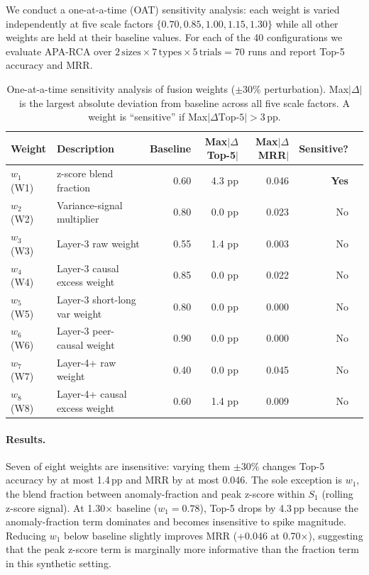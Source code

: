\documentclass{article}
\newcommand{\aparca}{\textsc{APA-RCA}}
\begin{document}
We conduct a one-at-a-time (OAT) sensitivity analysis: each weight is varied
independently at five scale factors $\{0.70, 0.85, 1.00, 1.15, 1.30\}$
while all other weights are held at their baseline values.
For each of the 40 configurations we evaluate \aparca{} over
$2\,\text{sizes} \times 7\,\text{types} \times 5\,\text{trials} = 70$ runs
and report Top-5 accuracy and MRR.

\begin{table}[h]
  \centering
  \caption{%
    One-at-a-time sensitivity analysis of fusion weights ($\pm$30\% perturbation).
    Max$|\Delta|$ is the largest absolute deviation from baseline across all
    five scale factors.  A weight is ``sensitive'' if Max$|\Delta\text{Top-5}|>3$\,pp.
  }
  \label{tab:sensitivity}
  \small
  \begin{tabular}{llrrrrl}
    \toprule
    Weight & Description & Baseline & Max$|\Delta$Top-5$|$ & Max$|\Delta$MRR$|$ & Sensitive? \\
    \midrule
    $w_1$ (W1) & z-score blend fraction      & 0.60 & 4.3 pp & 0.046 & \textbf{Yes} \\
    $w_2$ (W2) & Variance-signal multiplier   & 0.80 & 0.0 pp & 0.023 & No \\
    $w_3$ (W3) & Layer-3 raw weight           & 0.55 & 1.4 pp & 0.003 & No \\
    $w_4$ (W4) & Layer-3 causal excess weight & 0.85 & 0.0 pp & 0.022 & No \\
    $w_5$ (W5) & Layer-3 short-long var weight& 0.80 & 0.0 pp & 0.000 & No \\
    $w_6$ (W6) & Layer-3 peer-causal weight   & 0.90 & 0.0 pp & 0.000 & No \\
    $w_7$ (W7) & Layer-4+ raw weight          & 0.40 & 0.0 pp & 0.045 & No \\
    $w_8$ (W8) & Layer-4+ causal excess weight& 0.60 & 1.4 pp & 0.009 & No \\
    \bottomrule
  \end{tabular}
\end{table}

\paragraph{Results.}
Seven of eight weights are insensitive: varying them $\pm$30\% changes Top-5
accuracy by at most 1.4\,pp and MRR by at most 0.046.
The sole exception is $w_1$, the blend fraction between anomaly-fraction
and peak z-score within $S_1$ (rolling z-score signal).
At 1.30$\times$ baseline ($w_1 = 0.78$), Top-5 drops by 4.3\,pp because
the anomaly-fraction term dominates and becomes insensitive to spike magnitude.
Reducing $w_1$ below baseline slightly improves MRR (+0.046 at 0.70$\times$),
suggesting that the peak z-score term is marginally more informative than the
fraction term in this synthetic setting.
\end{document}
